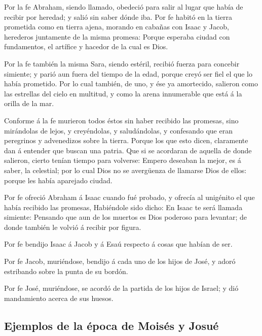  Por la fe Abraham, siendo llamado, obedeció para salir al
lugar que había de recibir por heredad; y salió sin saber dónde iba.
 Por fe habitó en la tierra prometida como en tierra ajena,
morando en cabañas con Isaac y Jacob, herederos juntamente de la misma
promesa:  Porque esperaba ciudad con fundamentos, el
artífice y hacedor de la cual es Dios.

 Por la fe también la misma Sara, siendo estéril, recibió
fuerza para concebir simiente; y parió aun fuera del tiempo de la edad,
porque creyó ser fiel el que lo había prometido.  Por lo
cual también, de uno, y ése ya amortecido, salieron como las estrellas
del cielo en multitud, y como la arena innumerable que está á la orilla
de la mar.

 Conforme á la fe murieron todos éstos sin haber recibido
las promesas, sino mirándolas de lejos, y creyéndolas, y saludándolas, y
confesando que eran peregrinos y advenedizos sobre la tierra.
 Porque los que esto dicen, claramente dan á entender que
buscan una patria.  Que si se acordaran de aquella de donde
salieron, cierto tenían tiempo para volverse:  Empero
deseaban la mejor, es á saber, la celestial; por lo cual Dios no se
avergüenza de llamarse Dios de ellos: porque les había aparejado ciudad.

 Por fe ofreció Abraham á Isaac cuando fué probado, y
ofrecía al unigénito el que había recibido las promesas, 
Habiéndole sido dicho: En Isaac te será llamada simiente: 
Pensando que aun de los muertos es Dios poderoso para levantar; de donde
también le volvió á recibir por figura.

 Por fe bendijo Isaac á Jacob y á Esaú respecto á cosas que
habían de ser.

 Por fe Jacob, muriéndose, bendijo á cada uno de los hijos
de José, y adoró estribando sobre la punta de su bordón.

 Por fe José, muriéndose, se acordó de la partida de los
hijos de Israel; y dió mandamiento acerca de sus huesos.

\hypertarget{ejemplos-de-la-uxe9poca-de-moisuxe9s-y-josuuxe9}{%
\subsection{Ejemplos de la época de Moisés y
Josué}\label{ejemplos-de-la-uxe9poca-de-moisuxe9s-y-josuuxe9}}

